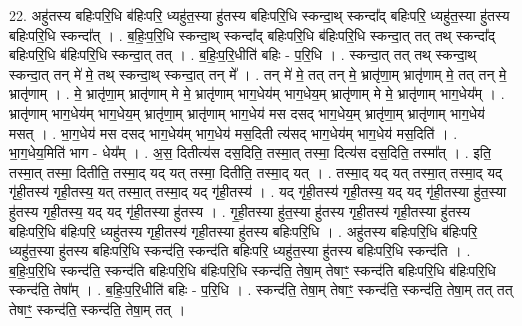 \documentclass[17pt]{extarticle}
\begin{document}
22. अहु॑तस्य बहिःपरि॒धि ब॑हिःपरि॒ ध्यहु॑त॒स्या हु॑तस्य बहिःपरि॒धि स्कन्दा॒थ् स्कन्दा᳚द् बहिःपरि॒ ध्यहु॑त॒स्या हु॑तस्य 
बहिःपरि॒धि स्कन्दा᳚त् । . ब॒हिः॒प॒रि॒धि स्कन्दा॒थ् स्कन्दा᳚द् बहिःपरि॒धि ब॑हिःपरि॒धि स्कन्दा॒त् तत् तथ् स्कन्दा᳚द् बहिःपरि॒धि ब॑हिःपरि॒धि स्कन्दा॒त् तत् । . ब॒हिः॒प॒रि॒धीति॑ बहिः - प॒रि॒धि । . स्कन्दा॒त् तत् तथ् स्कन्दा॒थ् स्कन्दा॒त् तन् मे॑ मे॒ तथ् स्कन्दा॒थ् स्कन्दा॒त् तन् मे᳚ । . तन् मे॑ मे॒ तत् तन् मे॒ भ्रातृ॑णा॒म् भ्रातृ॑णाम् मे॒ तत् तन् मे॒ भ्रातृ॑णाम् । . मे॒ भ्रातृ॑णा॒म् भ्रातृ॑णाम् मे मे॒ भ्रातृ॑णाम् भाग॒धेय॑म् भाग॒धेय॒म् भ्रातृ॑णाम् मे मे॒ भ्रातृ॑णाम् भाग॒धेय᳚म् । . भ्रातृ॑णाम् भाग॒धेय॑म् भाग॒धेय॒म् भ्रातृ॑णा॒म् भ्रातृ॑णाम् भाग॒धेय॑ मस दसद् भाग॒धेय॒म् भ्रातृ॑णा॒म् भ्रातृ॑णाम् भाग॒धेय॑ मसत् । . भा॒ग॒धेय॑ मस दसद् भाग॒धेय॑म् भाग॒धेय॑ मस॒दिती त्य॑सद् भाग॒धेय॑म् भाग॒धेय॑ मस॒दिति॑ । . भा॒ग॒धेय॒मिति॑ भाग - धेय᳚म् । . अ॒स॒ दितीत्य॑स दस॒दिति॒ तस्मा॒त् तस्मा॒ दित्य॑स दस॒दिति॒ तस्मा᳚त् । . इति॒ तस्मा॒त् तस्मा॒ दितीति॒ तस्मा॒द् यद् यत् तस्मा॒ दितीति॒ तस्मा॒द् यत् । . तस्मा॒द् यद् यत् तस्मा॒त् तस्मा॒द् यद् गृ॑ही॒तस्य॑ गृही॒तस्य॒ यत् तस्मा॒त् तस्मा॒द् यद् गृ॑ही॒तस्य॑ । . यद् गृ॑ही॒तस्य॑ गृही॒तस्य॒ यद् यद् गृ॑ही॒तस्या हु॑त॒स्या हु॑तस्य गृही॒तस्य॒ यद् यद् गृ॑ही॒तस्या हु॑तस्य । . गृ॒ही॒तस्या हु॑त॒स्या हु॑तस्य गृही॒तस्य॑ गृही॒तस्या हु॑तस्य बहिःपरि॒धि ब॑हिःपरि॒ ध्यहु॑तस्य गृही॒तस्य॑ गृही॒तस्या हु॑तस्य बहिःपरि॒धि । . अहु॑तस्य बहिःपरि॒धि ब॑हिःपरि॒ ध्यहु॑त॒स्या हु॑तस्य बहिःपरि॒धि स्कन्द॑ति॒ स्कन्द॑ति बहिःपरि॒ ध्यहु॑त॒स्या हु॑तस्य 
बहिःपरि॒धि स्कन्द॑ति । . ब॒हिः॒प॒रि॒धि स्कन्द॑ति॒ स्कन्द॑ति बहिःपरि॒धि ब॑हिःपरि॒धि स्कन्द॑ति॒ तेषा॒म् तेषाꣳ॒॒ स्कन्द॑ति बहिःपरि॒धि 
ब॑हिःपरि॒धि स्कन्द॑ति॒ तेषा᳚म् । . ब॒हिः॒प॒रि॒धीति॑ बहिः - प॒रि॒धि । . स्कन्द॑ति॒ तेषा॒म् तेषाꣳ॒॒ स्कन्द॑ति॒ स्कन्द॑ति॒ तेषा॒म् तत् तत् तेषाꣳ॒॒ स्कन्द॑ति॒ स्कन्द॑ति॒ तेषा॒म् तत् । \newline
\end{document}
